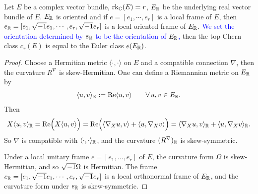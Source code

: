 \begin{proposition}
    Let $E$ be a complex vector bundle, ${\rm rk}_{\mathbb{C}}(E) = r$, 
    $E_{\mathbb{R}}$ be the underlying real vector bundle of $E$. 
    $E_{\mathbb{R}}$ is oriented and if $e = [e_1,\cdots,e_r]$ is a local frame of $E$, 
    then $e_{\mathbb{R}} = [e_1,\sqrt{-1} e_1,\cdots,e_r,\sqrt{-1} e_r]$ is a local oriented frame of $E_{\mathbb{R}}$. 
    \textcolor{blue}{We set the orientation determined by $e_{\mathbb{R}}$ to be the orientation of $E_{\mathbb{R}}$,}
    then the top Chern class $c_r(E)$ is equal to the Euler class $e(E_{\mathbb{R}})$. 
\end{proposition}
\begin{proof}
    Choose a Hermitian metric $\langle \cdot, \cdot \rangle$ on $E$ and a compatible connection $\nabla$, 
    then the curvature $R^\nabla$ is skew-Hermitian. One can define a Riemannian metric on $E_{\mathbb{R}}$ by 
    \begin{equation*}
        \langle u,v\rangle_{\mathbb{R}} := \mathrm{Re}\langle u,v\rangle\qquad\forall\,u,v\in E_{\mathbb{R}}.
    \end{equation*}
    Then
    \begin{equation*}
        X\langle u,v\rangle_{\mathbb{R}} = \mathrm{Re}\Big(X\langle u,v\rangle\Big) 
        = \mathrm{Re}\Big(\langle\nabla_X u,v\rangle + \langle u,\nabla_X v\rangle\Big)
         = \langle\nabla_X u,v\rangle_{\mathbb{R}} + \langle u,\nabla_X v\rangle_{\mathbb{R}}.
    \end{equation*}
    So $\nabla$ is compatible with $\langle \cdot, \cdot \rangle_{\mathbb{R}}$, 
    and the curvature $(R^{\nabla})_{\mathbb{R}}$ is skew-symmetric. 
    
    Under a local unitary frame $e = [e_1,\dots,e_r]$ of $E$, 
    the curvature form $\Omega$ is skew-Hermitian, and so $\sqrt{-1}\Omega$ is Hermitian.
    The frame $e_{\mathbb{R}} = [e_1,\sqrt{-1} e_1,\cdots,e_r,\sqrt{-1} e_r]$ is a local orthonormal frame of $E_{\mathbb{R}}$, 
    and the curvature form under $e_{\mathbb{R}}$ is skew-symmetric. 


\end{proof}

